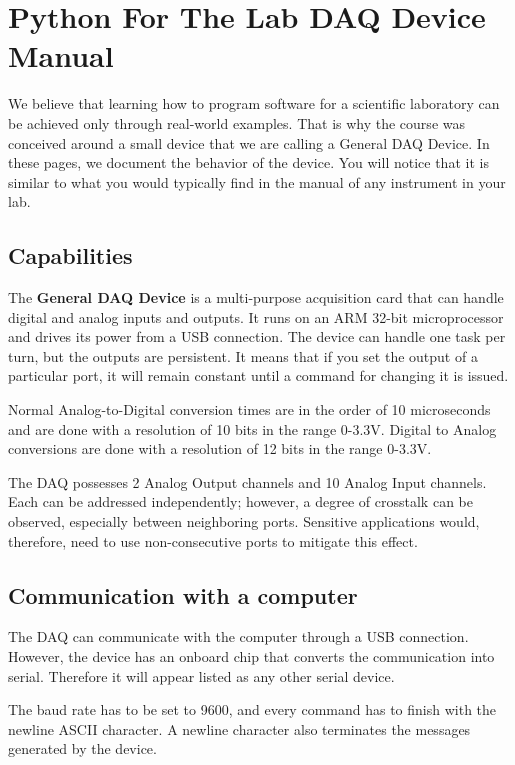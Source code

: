 \chapter{Python For The Lab {DAQ} Device Manual}\label{chapter:pftl-daq-manual}
We believe that learning how to program software for a scientific laboratory can be achieved only through real-world examples. That is why the course was conceived around a small device that we are calling a General {DAQ} Device. In these pages, we document the behavior of the device. You will notice that it is similar to what you would typically find in the manual of any instrument in your lab.

\section{Capabilities}\label{capabilities}
The \textbf{General {DAQ} Device} is a multi-purpose acquisition card that can handle digital and analog inputs and outputs. It runs on an {ARM} 32-bit microprocessor and drives its power from a {USB} connection. The device can handle one task per turn, but the outputs are persistent. It means that if you set the output of a particular port, it will remain constant until a command for changing it is issued.

Normal Analog-to-Digital conversion times are in the order of 10 microseconds and are done with a resolution of 10 bits in the range 0-3.3V. Digital to Analog conversions are done with a resolution of 12 bits in the range 0-3.3V.

The {DAQ} possesses 2 Analog Output channels and 10 Analog Input channels. Each can be addressed independently; however, a degree of crosstalk can be observed, especially between neighboring ports. Sensitive applications would, therefore, need to use non-consecutive ports to mitigate this effect.

\section{Communication with a computer}\label{communication-with-acomputer}
The {DAQ} can communicate with the computer through a {USB} connection. However, the device has an onboard chip that converts the communication into serial. Therefore it will appear listed as any other serial device.

The baud rate has to be set to 9600, and every command has to finish with the newline {ASCII} character. A newline character also terminates the messages generated by the device.

